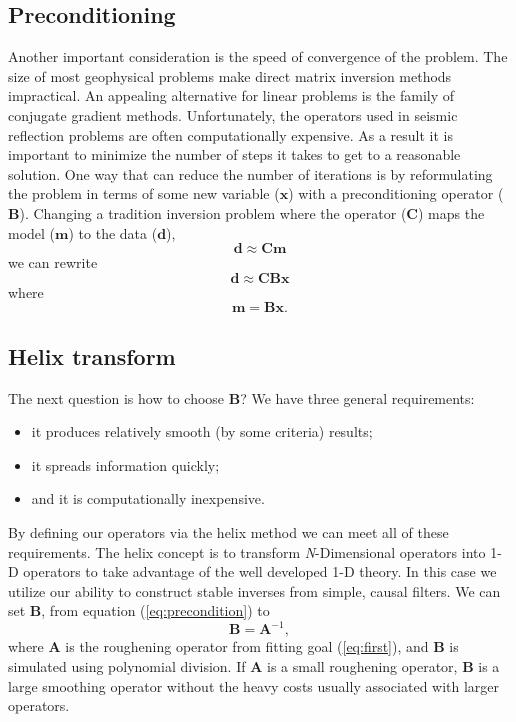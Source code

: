 \subsection{Preconditioning}
Another important consideration is the speed of convergence of the problem.  
The size of most geophysical
problems make direct matrix inversion methods impractical. 
An appealing alternative for linear problems is the family of
conjugate gradient methods.  Unfortunately, 
the operators used in seismic reflection  problems
are often computationally expensive.
As a result it is important to minimize the number of steps it takes
to get to a reasonable solution.
One way that can reduce the number of iterations is by reformulating the 
problem in terms of some new variable ($\mathbf x$) with a preconditioning
operator ($\mathbf B$).  Changing a tradition inversion problem where the
operator ($\mathbf C$) maps the model ($\mathbf m$) to the data ($\mathbf d$),
\begin{equation}
\mathbf d \approx \mathbf C \mathbf m
\label{eq:precondition1}
\end{equation}
we can rewrite 
\begin{equation}
\mathbf d \approx \mathbf C \mathbf B \mathbf x
\end{equation}
where
\begin{equation}
\mathbf m = \mathbf B  \mathbf x.
\label{eq:precondition}
\end{equation}

\subsection{Helix transform}
The next question is  how to choose  $\mathbf B$?
We have three general requirements:
\begin{itemize}
\item it produces relatively smooth (by some criteria) results;
\item it spreads information quickly;
\item and it is computationally inexpensive.
\end{itemize}
By defining our operators via the helix method 
\cite[]{Claerbout.sep.95.jon1} we can meet all of these
requirements.
The helix concept is to transform {\it N}-Dimensional
operators into  1-D operators  to take
advantage of the well developed  1-D theory.
In this case we utilize our ability to construct 
stable inverses from simple, causal filters.  
 We can set $\mathbf B$,  from equation  (\ref{eq:precondition})  to
\begin{equation}
\mathbf B = \mathbf  A^{-1} ,
\label{eq:inverse}
\end{equation}
where $\mathbf A$ is the roughening operator from fitting
goal (\ref{eq:first}), and $\mathbf B$ is simulated using
polynomial division.
If $\mathbf A$ is a small roughening
operator, $\mathbf B$ is a large smoothing operator without the
heavy costs usually associated with larger operators.

